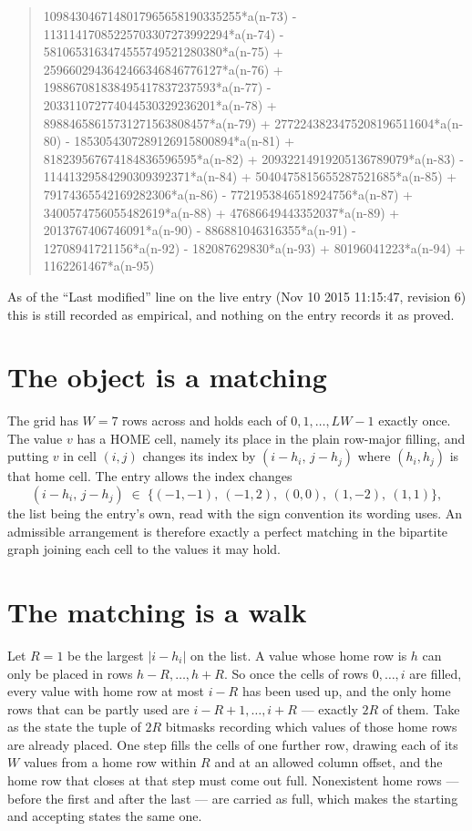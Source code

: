 \documentclass[11pt,a4paper]{article}
\theoremstyle{plain}
\theoremstyle{definition}
\begin{document}
\begin{quote}
1098430467148017965658190335255*a(n-73) - 11311417085225703307273992294*a(n-74) - 5810653163474555749521280380*a(n-75) + 2596602943642466346846776127*a(n-76) + 198867081838495417837237593*a(n-77) - 203311072774044530329236201*a(n-78) + 89884658615731271563808457*a(n-79) + 2772243823475208196511604*a(n-80) - 1853054307289126915800894*a(n-81) + 818239567674184836596595*a(n-82) + 20932214919205136789079*a(n-83) - 11441329584290309392371*a(n-84) + 5040475815655287521685*a(n-85) + 79174365542169282306*a(n-86) - 7721953846518924756*a(n-87) + 3400574756055482619*a(n-88) + 47686649443352037*a(n-89) + 2013767406746091*a(n-90) - 886881046316355*a(n-91) - 12708941721156*a(n-92) - 182087629830*a(n-93) + 80196041223*a(n-94) + 1162261467*a(n-95)
\end{quote}
As of the ``Last modified'' line on the live entry (Nov 10 2015 11:15:47, revision 6) this is still
recorded as empirical, and nothing on the entry records it as proved.

\section{The object is a matching}

The grid has $W=7$ rows across and holds each of $0,1,\dots,LW-1$ exactly once. The value
$v$ has a HOME cell, namely its place in the plain row-major filling, and putting $v$ in cell
$(i,j)$ changes its index by $(i-h_i,\,j-h_j)$ where $(h_i,h_j)$ is that home cell. The entry
allows the index changes
\[
(i-h_i,\,j-h_j)\;\in\;\{(-1,-1),\ (-1,2),\ (0,0),\ (1,-2),\ (1,1)\},
\]
the list being the entry's own, read with the sign convention its wording uses. An admissible
arrangement is therefore exactly a perfect matching in the bipartite graph joining each cell to
the values it may hold.

\section{The matching is a walk}

Let $R=1$ be the largest $|i-h_i|$ on the list. A value whose home row is $h$ can only be
placed in rows $h-R,\dots,h+R$. So once the cells of rows $0,\dots,i$ are filled, every
value with home row at most $i-R$ has been used up, and the only home rows that can be
partly used are $i-R+1,\dots,i+R$ --- exactly $2R$ of them. Take as the state the tuple of
$2R$ bitmasks recording which values of those home rows are already placed. One step fills
the cells of one further row, drawing each of its $W$ values from a home row within $R$
and at an allowed column offset, and the home row that closes at that step must come out
full. Nonexistent home rows --- before the first and after the last --- are carried as
full, which makes the starting and accepting states the same one.
\end{document}
